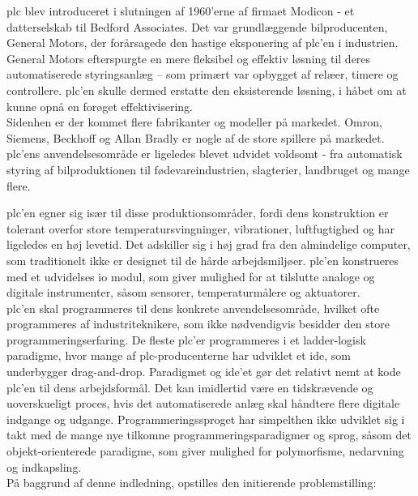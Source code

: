 \gls{plc} blev introduceret i slutningen af 1960'erne af firmaet Modicon - et datterselskab til Bedford Associates. Det var grundlæggende bilproducenten, General Motors, der forårsagede den hastige eksponering af \gls{plc}'en i industrien. General Motors efterspurgte en mere fleksibel og effektiv løsning til deres automatiserede styringsanlæg – som primært var opbygget af relæer, timere og controllere. \gls{plc}'en skulle dermed erstatte den eksisterende løsning, i håbet om at kunne opnå en forøget effektivisering. \\

\noindent Sidenhen er der kommet flere fabrikanter og modeller på markedet. Omron, Siemens, Beckhoff og Allan Bradly er nogle af de store spillere på markedet. \gls{plc}'ens anvendelsesområde er ligeledes blevet udvidet voldsomt - fra automatisk styring af bilproduktionen til fødevareindustrien, slagterier, landbruget og mange flere. 

\noindent \gls{plc}'en egner sig især til disse produktionsområder, fordi dens konstruktion er tolerant overfor store temperatursvingninger, vibrationer, luftfugtighed og har ligeledes en høj levetid. Det adskiller sig i høj grad fra den almindelige computer, som traditionelt ikke er designet til de hårde arbejdsmiljøer. \gls{plc}'en konstrueres med et udvidelses \gls{io} modul, som giver mulighed for at tilslutte analoge og digitale instrumenter, såsom sensorer, temperaturmålere og aktuatorer. \\

\noindent \gls{plc}'en skal programmeres til dens konkrete anvendelsesområde, hvilket ofte programmeres af industriteknikere, som ikke nødvendigvis besidder den store programmeringserfaring. De fleste \gls{plc}'er programmeres i et ladder-logisk paradigme, hvor mange af \gls{plc}-producenterne har udviklet et \gls{ide}, som underbygger drag-and-drop. Paradigmet og \gls{ide}'et gør det relativt nemt at kode \gls{plc}'en til dens arbejdsformål. Det kan imidlertid være en tidskrævende og uoverskueligt proces, hvis det automatiserede anlæg skal håndtere flere digitale indgange og udgange. Programmeringssproget har simpelthen ikke udviklet sig i takt med de mange nye tilkomne programmeringsparadigmer og sprog, såsom det objekt-orienterede paradigme, som giver mulighed for polymorfisme, nedarvning og indkapsling. \\

\noindent På baggrund af denne indledning, opstilles den initierende problemstilling: \\

